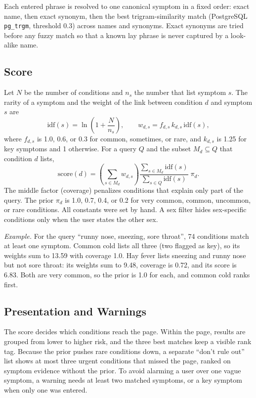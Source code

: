 \documentclass[conference]{IEEEtran}
\begin{document}
Each entered phrase is resolved to one canonical symptom in a fixed order: exact name, then exact synonym, then the best trigram-similarity match (PostgreSQL \texttt{pg\_trgm}, threshold 0.3) across names and synonyms. Exact synonyms are tried before any fuzzy match so that a known lay phrase is never captured by a look-alike name.

\subsection{Score}

Let $N$ be the number of conditions and $n_s$ the number that list symptom $s$. The rarity of a symptom and the weight of the link between condition $d$ and symptom $s$ are
\begin{equation}
\mathrm{idf}(s)=\ln\left(1+\frac{N}{n_s}\right), \qquad
w_{d,s}=f_{d,s}\,k_{d,s}\,\mathrm{idf}(s),
\label{eq:weight}
\end{equation}
where $f_{d,s}$ is 1.0, 0.6, or 0.3 for common, sometimes, or rare, and $k_{d,s}$ is 1.25 for key symptoms and 1 otherwise. For a query $Q$ and the subset $M_d \subseteq Q$ that condition $d$ lists,
\begin{equation}
\mathrm{score}(d)=\left(\sum_{s\in M_d} w_{d,s}\right)
\frac{\sum_{s\in M_d}\mathrm{idf}(s)}{\sum_{s\in Q}\mathrm{idf}(s)}\;\pi_d .
\label{eq:score}
\end{equation}
The middle factor (coverage) penalizes conditions that explain only part of the query. The prior $\pi_d$ is 1.0, 0.7, 0.4, or 0.2 for very common, common, uncommon, or rare conditions. All constants were set by hand. A sex filter hides sex-specific conditions only when the user states the other sex.

\textit{Example.} For the query ``runny nose, sneezing, sore throat'', 74 conditions match at least one symptom. Common cold lists all three (two flagged as key), so its weights sum to 13.59 with coverage 1.0. Hay fever lists sneezing and runny nose but not sore throat: its weights sum to 9.48, coverage is 0.72, and its score is 6.83. Both are very common, so the prior is 1.0 for each, and common cold ranks first.

\subsection{Presentation and Warnings}

The score decides which conditions reach the page. Within the page, results are grouped from lower to higher risk, and the three best matches keep a visible rank tag. Because the prior pushes rare conditions down, a separate ``don't rule out'' list shows at most three urgent conditions that missed the page, ranked on symptom evidence without the prior. To avoid alarming a user over one vague symptom, a warning needs at least two matched symptoms, or a key symptom when only one was entered.
\end{document}
